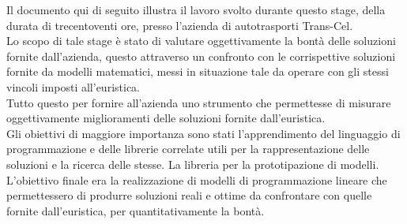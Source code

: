 
Il documento qui di seguito illustra il lavoro svolto durante questo stage, della durata di trecentoventi ore, presso l’azienda di autotrasporti Trans-Cel.\\
Lo scopo di tale stage è stato di valutare oggettivamente la bontà delle soluzioni fornite dall'azienda, questo attraverso un confronto con le corrispettive soluzioni fornite da modelli matematici, messi in situazione tale da operare con gli stessi vincoli imposti all'euristica.\\
Tutto questo per fornire all'azienda uno strumento che permettesse di misurare oggettivamente miglioramenti delle soluzioni fornite dall'euristica.\\
\newline
Gli obiettivi di maggiore importanza sono stati l'apprendimento del linguaggio di programmazione  e delle librerie correlate utili per la rappresentazione delle soluzioni e la ricerca delle stesse. La libreria  per la prototipazione di modelli.\\
L'obiettivo finale era la realizzazione di modelli di programmazione lineare che permettessero di produrre soluzioni reali e ottime da confrontare con quelle fornite dall'euristica, per quantitativamente la bontà.
